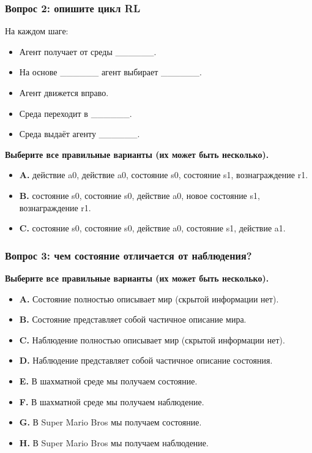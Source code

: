 \documentclass[11pt,a4paper]{article}
\begin{document}
\subsubsection{Вопрос 2: опишите цикл RL}\label{q2-define-the-rl-loop}


На каждом шаге:

\begin{itemize}
\tightlist
\item
  Агент получает от среды \_\_\_\_\_\_.
\item
  На основе \_\_\_\_\_\_ агент выбирает \_\_\_\_\_\_.
\item
  Агент движется вправо.
\item
  Среда переходит в \_\_\_\_\_\_.
\item
  Среда выдаёт агенту \_\_\_\_\_\_.
\end{itemize}

\textbf{Выберите все правильные варианты (их может быть несколько).}

\begin{itemize}
\tightlist
\item
  \textbf{A.} действие a0, действие a0, состояние s0, состояние s1, вознаграждение r1.
\item
  \textbf{B.} состояние s0, состояние s0, действие a0, новое состояние s1, вознаграждение r1.
\item
  \textbf{C.} состояние s0, состояние s0, действие a0, состояние s1, действие a1.
\end{itemize}

\subsubsection{Вопрос 3: чем состояние отличается от наблюдения?}\label{q3-whats-the-difference-between-a-state-and-an-observation}

\textbf{Выберите все правильные варианты (их может быть несколько).}

\begin{itemize}
\tightlist
\item
  \textbf{A.} Состояние полностью описывает мир (скрытой информации нет).
\item
  \textbf{B.} Состояние представляет собой частичное описание мира.
\item
  \textbf{C.} Наблюдение полностью описывает мир (скрытой информации нет).
\item
  \textbf{D.} Наблюдение представляет собой частичное описание состояния.
\item
  \textbf{E.} В шахматной среде мы получаем состояние.
\item
  \textbf{F.} В шахматной среде мы получаем наблюдение.
\item
  \textbf{G.} В Super Mario Bros мы получаем состояние.
\item
  \textbf{H.} В Super Mario Bros мы получаем наблюдение.
\end{itemize}
\end{document}
